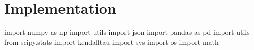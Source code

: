 \documentclass[
  letterpaper,
  DIV=11,
  numbers=noendperiod]{scrreprt}
\newenvironment{Shaded}{\begin{snugshade}}{\end{snugshade}}
\newcommand{\ImportTok}[1]{\textcolor[rgb]{0.00,0.46,0.62}{#1}}
\newcommand{\NormalTok}[1]{\textcolor[rgb]{0.00,0.23,0.31}{#1}}
\begin{document}
\section{Implementation}\label{implementation-2}

\begin{Shaded}
\begin{Highlighting}[]
\ImportTok{import}\NormalTok{ numpy }\ImportTok{as}\NormalTok{ np }
\ImportTok{import}\NormalTok{ utils }
\ImportTok{import}\NormalTok{ json }
\ImportTok{import}\NormalTok{ pandas }\ImportTok{as}\NormalTok{ pd }
\ImportTok{import}\NormalTok{ utils }
\ImportTok{from}\NormalTok{ scipy.stats }\ImportTok{import}\NormalTok{ kendalltau}
\ImportTok{import}\NormalTok{ sys}
\ImportTok{import}\NormalTok{ os}
\ImportTok{import}\NormalTok{ math }
\end{Highlighting}
\end{Shaded}
\end{document}
